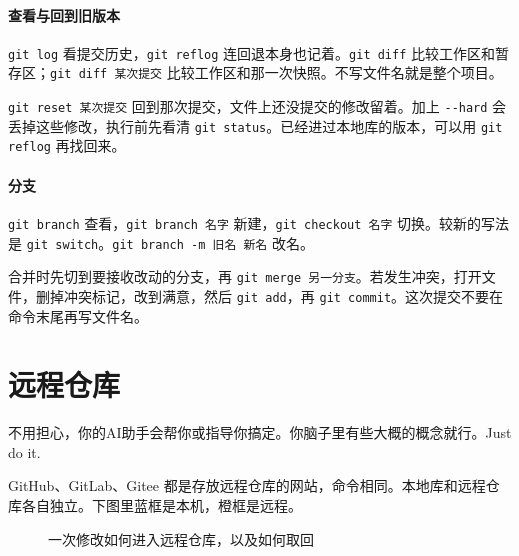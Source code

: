 \paragraph{查看与回到旧版本}
\verb|git log| 看提交历史，\verb|git reflog| 连回退本身也记着。\verb|git diff| 比较工作区和暂存区；\verb|git diff 某次提交| 比较工作区和那一次快照。不写文件名就是整个项目。

\verb|git reset 某次提交| 回到那次提交，文件上还没提交的修改留着。加上 \verb|--hard| 会丢掉这些修改，执行前先看清 \verb|git status|。已经进过本地库的版本，可以用 \verb|git reflog| 再找回来。

\paragraph{分支}
\verb|git branch| 查看，\verb|git branch 名字| 新建，\verb|git checkout 名字| 切换。较新的写法是 \verb|git switch|。\verb|git branch -m 旧名 新名| 改名。

合并时先切到要接收改动的分支，再 \verb|git merge 另一分支|。若发生冲突，打开文件，删掉冲突标记，改到满意，然后 \verb|git add|，再 \verb|git commit|。这次提交不要在命令末尾再写文件名。




\section{远程仓库}
\begin{xiaonao}[感觉好复杂怎么办？]
不用担心，你的AI助手会帮你或指导你搞定。你脑子里有些大概的概念就行。Just do it.
\end{xiaonao}

GitHub、GitLab、Gitee 都是存放远程仓库的网站，命令相同。本地库和远程仓库各自独立。下图里蓝框是本机，橙框是远程。

\begin{figure}[htbp]
\centering
{}
\caption{一次修改如何进入远程仓库，以及如何取回}
\end{figure}

